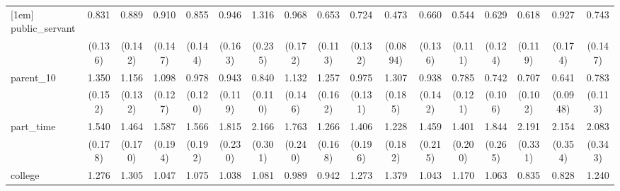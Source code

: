 {\begin{tabular}{l*{16}{c}}
[1em]
public\_servant      &       0.831         &       0.889         &       0.910         &       0.855         &       0.946         &       1.316         &       0.968         &       0.653\sym{*}  &       0.724         &       0.473\sym{***}&       0.660\sym{*}  &       0.544\sym{**} &       0.629\sym{*}  &       0.618\sym{*}  &       0.927         &       0.743         \\
                    &     (0.136)         &     (0.142)         &     (0.147)         &     (0.144)         &     (0.163)         &     (0.235)         &     (0.172)         &     (0.113)         &     (0.132)         &    (0.0894)         &     (0.136)         &     (0.111)         &     (0.124)         &     (0.119)         &     (0.174)         &     (0.147)         \\
[1em]
parent\_10           &       1.350\sym{**} &       1.156         &       1.098         &       0.978         &       0.943         &       0.840         &       1.132         &       1.257         &       0.975         &       1.307         &       0.938         &       0.785         &       0.742\sym{*}  &       0.707\sym{*}  &       0.641\sym{**} &       0.783         \\
                    &     (0.152)         &     (0.132)         &     (0.127)         &     (0.120)         &     (0.119)         &     (0.110)         &     (0.146)         &     (0.162)         &     (0.131)         &     (0.185)         &     (0.142)         &     (0.121)         &     (0.106)         &     (0.102)         &    (0.0948)         &     (0.113)         \\
[1em]
part\_time           &       1.540\sym{***}&       1.464\sym{**} &       1.587\sym{***}&       1.566\sym{***}&       1.815\sym{***}&       2.166\sym{***}&       1.763\sym{***}&       1.266         &       1.406\sym{*}  &       1.228         &       1.459\sym{*}  &       1.401\sym{*}  &       1.844\sym{***}&       2.191\sym{***}&       2.154\sym{***}&       2.083\sym{***}\\
                    &     (0.178)         &     (0.170)         &     (0.194)         &     (0.192)         &     (0.230)         &     (0.301)         &     (0.240)         &     (0.168)         &     (0.196)         &     (0.182)         &     (0.215)         &     (0.200)         &     (0.265)         &     (0.331)         &     (0.354)         &     (0.343)         \\
[1em]
college             &       1.276         &       1.305\sym{*}  &       1.047         &       1.075         &       1.038         &       1.081         &       0.989         &       0.942         &       1.273         &       1.379         &       1.043         &       1.170         &       1.063         &       0.835         &       0.828         &       1.240         \\

\end{tabular}}
